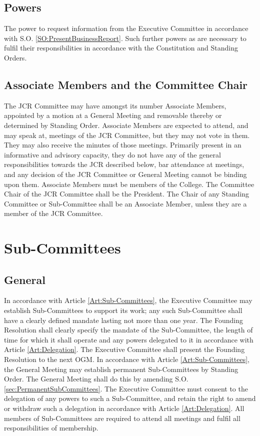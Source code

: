 \subsection{Powers}
\npara The power to request information from the Executive Committee in accordance with S.O. \ref{SO:PresentBusinessReport}.
\npara Such further powers as are necessary to fulfil their responsibilities in accordance with the Constitution and Standing Orders.
\subsection{Associate Members and the Committee Chair} \label{ssec:AssociateMembersAndCommitteeChair}
\npara The JCR Committee may have amongst its number Associate Members, appointed by a motion at a General Meeting and removable thereby or determined by Standing Order. Associate Members are expected to attend, and may speak at, meetings of the JCR Committee, but they may not vote in them. They may also receive the minutes of those meetings. Primarily present in an informative and advisory capacity, they do not have any of the general responsibilities towards the JCR described below, bar attendance at meetings, and any decision of the JCR Committee or General Meeting cannot be binding upon them.  Associate Members must be members of the College.
\npara The Committee Chair of the JCR Committee shall be the President.
\npara The Chair of any Standing Committee or Sub-Committee shall be an Associate Member, unless they are a member of the JCR Committee.
\section{Sub-Committees}
\subsection{General}
\npara In accordance with Article \ref{Art:Sub-Committees}, the Executive Committee may establish Sub-Committees to support its work; any such Sub-Committee shall have a clearly defined mandate lasting not more than one year.  The Founding Resolution shall clearly specify the mandate of the Sub-Committee, the length of time for which it shall operate and any powers delegated to it in accordance with Article \ref{Art:Delegation}.  The Executive Committee shall present the Founding Resolution to the next OGM.
\npara In accordance with Article \ref{Art:Sub-Committees}, the General Meeting may establish permanent Sub-Committees by Standing Order.  The General Meeting shall do this by amending S.O. \ref{sec:PermanentSubCommittees}.  The Executive Committee must consent to the delegation of any powers to such a Sub-Committee, and retain the right to amend or withdraw such a delegation in accordance with Article \ref{Art:Delegation}.
\npara All members of Sub-Committees are required to attend all meetings and fulfil all responsibilities of membership.
